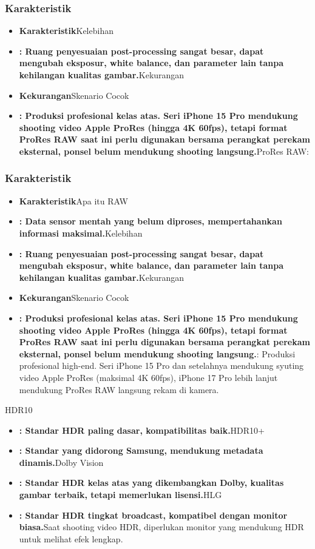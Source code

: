 \subsubsection*{Karakteristik}

\begin{itemize}
  \item \textbf{Karakteristik}Kelebihan
  \item \textbf{: Ruang penyesuaian post-processing sangat besar, dapat mengubah eksposur, white balance, dan parameter lain tanpa kehilangan kualitas gambar.}Kekurangan
  \item \textbf{Kekurangan}Skenario Cocok
  \item \textbf{: Produksi profesional kelas atas. Seri iPhone 15 Pro mendukung shooting video Apple ProRes (hingga 4K 60fps), tetapi format ProRes RAW saat ini perlu digunakan bersama perangkat perekam eksternal, ponsel belum mendukung shooting langsung.}ProRes RAW:
\end{itemize}

\subsubsection*{Karakteristik}

\begin{itemize}
  \item \textbf{Karakteristik}Apa itu RAW
  \item \textbf{: Data sensor mentah yang belum diproses, mempertahankan informasi maksimal.}Kelebihan
  \item \textbf{: Ruang penyesuaian post-processing sangat besar, dapat mengubah eksposur, white balance, dan parameter lain tanpa kehilangan kualitas gambar.}Kekurangan
  \item \textbf{Kekurangan}Skenario Cocok
  \item \textbf{: Produksi profesional kelas atas. Seri iPhone 15 Pro mendukung shooting video Apple ProRes (hingga 4K 60fps), tetapi format ProRes RAW saat ini perlu digunakan bersama perangkat perekam eksternal, ponsel belum mendukung shooting langsung.}: Produksi profesional high-end. Seri iPhone 15 Pro dan setelahnya mendukung syuting video Apple ProRes (maksimal 4K 60fps), iPhone 17 Pro lebih lanjut mendukung ProRes RAW langsung rekam di kamera.
\end{itemize}


HDR10

\begin{itemize}
  \item \textbf{: Standar HDR paling dasar, kompatibilitas baik.}HDR10+
  \item \textbf{: Standar yang didorong Samsung, mendukung metadata dinamis.}Dolby Vision
  \item \textbf{: Standar HDR kelas atas yang dikembangkan Dolby, kualitas gambar terbaik, tetapi memerlukan lisensi.}HLG
  \item \textbf{: Standar HDR tingkat broadcast, kompatibel dengan monitor biasa.}Saat shooting video HDR, diperlukan monitor yang mendukung HDR untuk melihat efek lengkap.
\end{itemize}


